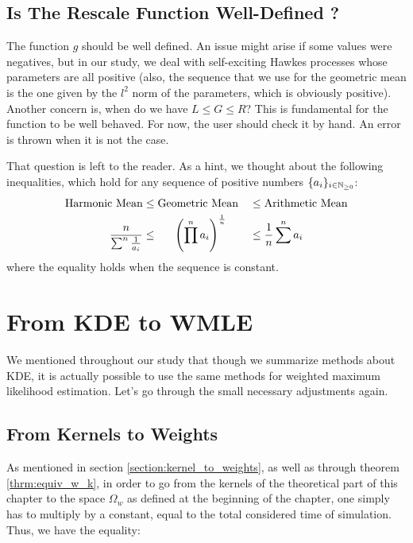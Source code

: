 \documentclass[11pt]{book}
\newcommand{\sequence}[1]{\{ #1 \}_{ i \in \N} }
\begin{document}
\subsection{Is The Rescale Function Well-Defined ?}
\label{subsection:self-defin}




The function $g$ should be well defined. An issue might arise if some values were negatives, but in our study, we deal with self-exciting Hawkes processes whose parameters are all positive (also, the sequence that we use for the geometric mean is the one given by the $l^2$ norm of the parameters, which is obviously positive). Another concern is, when do we have $L \leq G \leq R$? This is fundamental for the function to be well behaved. For now, the user should check it by hand. An error is thrown when it is not the case.


That question is left to the reader. As a hint, we thought about the following inequalities, which hold for any sequence of positive numbers $\sequence{a_i}$:
\begin{alignat}{2}
\text{Harmonic Mean} 
&\leq \text{Geometric Mean} 
&& \leq \text{Arithmetic Mean} \notag \\
\frac n {\sum^n \frac 1 {a_i} } 
& \leq \hspace{0.55 cm} \left ( \prod^n a_i \right ) ^{ \frac 1 n } 
&& \leq \frac 1 n \sum^n a_i \notag
\end{alignat}
where the equality holds when the sequence is constant.


















\section{From KDE to WMLE}

We mentioned throughout our study that though we summarize methods about KDE, it is actually possible to use the same methods for weighted maximum likelihood estimation. Let's go through the small necessary adjustments again.

\subsection{From Kernels to Weights}
As mentioned in section \ref{section:kernel_to_weights}, as well as through theorem \ref{thrm:equiv_w_k}, in order to go from the kernels of the theoretical part of this chapter to the space $\Omega_w$ as defined at the beginning of the chapter, one simply has to multiply by a constant, equal to the total considered time of simulation. Thus, we have the equality:
\end{document}
